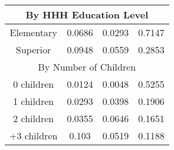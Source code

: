\begin{table}[]
\begin{tabular}{@{}cccc@{}}
\multicolumn{4}{c}{By HHH Education Level}                                  \\ \midrule
Elementary  & 0.0686                  & 0.0293           & 0.7147           \\
Superior    & 0.0948                  & 0.0559           & 0.2853           \\ \midrule
\multicolumn{4}{c}{By Number of Children}                                   \\ \midrule
0 children  & 0.0124                  & 0.0048           & 0.5255           \\
1 children  & 0.0293                  & 0.0398           & 0.1906           \\
2 children  & 0.0355                  & 0.0646           & 0.1651           \\
+3 children & 0.103                   & 0.0519           & 0.1188           \\ \bottomrule
\end{tabular}
\end{table}